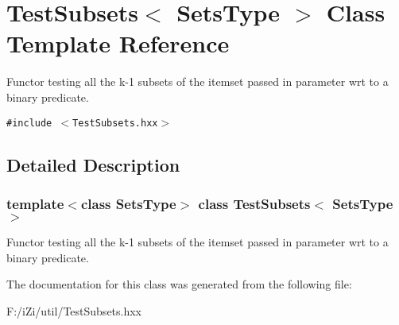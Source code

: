 \section{Test\-Subsets$<$ Sets\-Type $>$ Class Template Reference}
\label{class_test_subsets}
Functor testing all the k-1 subsets of the itemset passed in parameter wrt to a binary predicate.  


{\tt \#include $<$Test\-Subsets.hxx$>$}



\subsection{Detailed Description}
\subsubsection*{template$<$class Sets\-Type$>$ class Test\-Subsets$<$ Sets\-Type $>$}

Functor testing all the k-1 subsets of the itemset passed in parameter wrt to a binary predicate. 



The documentation for this class was generated from the following file:\begin{CompactItemize}
\item 
F:/i\-Zi/util/Test\-Subsets.hxx\end{CompactItemize}
